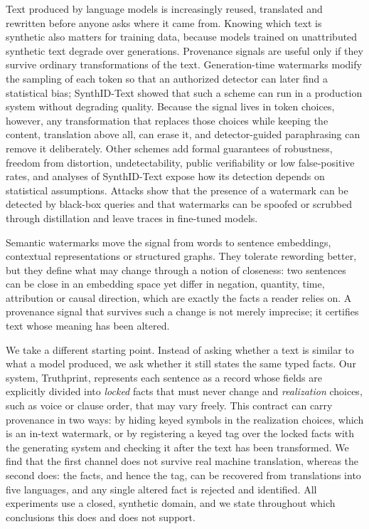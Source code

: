 \documentclass[12pt]{article}
\begin{document}
Text produced by language models is increasingly reused, translated and rewritten before anyone asks where it came from. Knowing which text is synthetic also matters for training data, because models trained on unattributed synthetic text degrade over generations\cite{shumailov2024collapse}. Provenance signals are useful only if they survive ordinary transformations of the text\cite{liu2024survey}. Generation-time watermarks modify the sampling of each token so that an authorized detector can later find a statistical bias\cite{kirchenbauer2023kgw,dathathri2024synthid}; SynthID-Text showed that such a scheme can run in a production system without degrading quality\cite{dathathri2024synthid}. Because the signal lives in token choices, however, any transformation that replaces those choices while keeping the content, translation above all, can erase it\cite{he2024crosslingual}, and detector-guided paraphrasing can remove it deliberately\cite{cheng2025adversarial}. Other schemes add formal guarantees of robustness, freedom from distortion, undetectability, public verifiability or low false-positive rates\cite{zhao2023provable,kuditipudi2024distortionfree,christ2024undetectable,liu2024unforgeable,fernandez2023threebricks}, and analyses of SynthID-Text expose how its detection depends on statistical assumptions\cite{omidi2026synthidanalysis,han2025synguard}. Attacks show that the presence of a watermark can be detected by black-box queries\cite{gloaguen2024blackbox} and that watermarks can be spoofed or scrubbed through distillation and leave traces in fine-tuned models\cite{yi2025unifiedattacks,sander2024radioactive}.

Semantic watermarks move the signal from words to sentence embeddings, contextual representations or structured graphs\cite{hou2024semstamp,ren2024semmark,liu2023sir,ye2026swan,schaefer2026dew}. They tolerate rewording better, but they define what may change through a notion of closeness: two sentences can be close in an embedding space yet differ in negation, quantity, time, attribution or causal direction, which are exactly the facts a reader relies on. A provenance signal that survives such a change is not merely imprecise; it certifies text whose meaning has been altered.

We take a different starting point. Instead of asking whether a text is similar to what a model produced, we ask whether it still states the same typed facts. Our system, Truthprint, represents each sentence as a record whose fields are explicitly divided into \emph{locked} facts that must never change and \emph{realization} choices, such as voice or clause order, that may vary freely. This contract can carry provenance in two ways: by hiding keyed symbols in the realization choices, which is an in-text watermark, or by registering a keyed tag over the locked facts with the generating system and checking it after the text has been transformed. We find that the first channel does not survive real machine translation, whereas the second does: the facts, and hence the tag, can be recovered from translations into five languages, and any single altered fact is rejected and identified. All experiments use a closed, synthetic domain, and we state throughout which conclusions this does and does not support.
\end{document}
